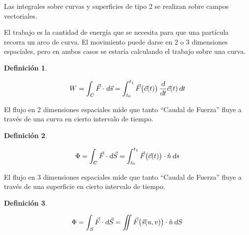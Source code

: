 \documentclass[a5paper,12pt,twoside]{book}
\newtheorem{defn}{{Definición}}[chapter]
\begin{document}

Las integrales sobre curvas y superficies de tipo 2 se realizan sobre campos vectoriales.

El trabajo es la cantidad de energía que se necesita para que una partícula recorra un arco de curva. El movimiento puede darse en 2 o 3 dimensiones espaciales, pero en ambos casos se estaría calculando el trabajo sobre una curva.

\begin{mdframed}[style=MyFrame1]
    \begin{defn}
        \label{defn:type2Int}
    \end{defn}
    \begin{equation*}
        W = \int_C \Vec{F} \cdot \textsl{d} \Vec{s}
        = \int_{t_0}^{t_1} \Vec{F} \big( \Vec{c}(t) \big) \, \dfrac{\textsl{d}}{\textsl{d} t} \Vec{c}(t) \, \textsl{d} t
    \end{equation*}
\end{mdframed}

El flujo en 2 dimensiones espaciales mide que tanto ``Caudal de Fuerza'' fluye a través de una curva en cierto intervalo de tiempo.

\begin{mdframed}[style=MyFrame1]
    \begin{defn}
    \end{defn}
    \begin{equation*}
        \Phi = \int_C \Vec{F} \cdot \textsl{d} \Vec{S}
        = \int_{t_0}^{t_1} \Vec{F} \big( \Vec{c}(t) \big) \cdot \hat{n} \, \textsl{d} s
    \end{equation*}
\end{mdframed}

El flujo en 3 dimensiones espaciales mide que tanto ``Caudal de Fuerza'' fluye a través de una superficie en cierto intervalo de tiempo.

\begin{mdframed}[style=MyFrame1]
    \begin{defn}
    \end{defn}
    \begin{equation*}
        \Phi = \int_S \Vec{F} \cdot \textsl{d} \Vec{S}
        = \iint \Vec{F} \big( \Vec{s}(u,v) \big) \cdot \hat{n} \, \textsl{d} S
    \end{equation*}
\end{mdframed}
\end{document}
